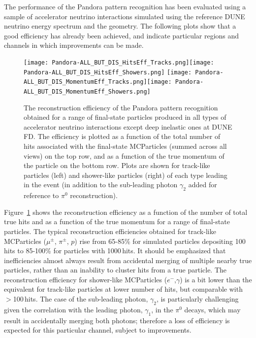 The performance of the Pandora pattern recognition has been evaluated using a sample of accelerator neutrino interactions simulated using the reference DUNE neutrino energy spectrum and the \nominalmodsize {} geometry. The following plots show that a good efficiency has already been achieved, and indicate particular regions and channels in which improvements can be made. 

\begin{figure}[!ht]
\centering
\texttt{[image: Pandora-ALL\_BUT\_DIS\_HitsEff\_Tracks.png]}\texttt{[image: Pandora-ALL\_BUT\_DIS\_HitsEff\_Showers.png]}
\texttt{[image: Pandora-ALL\_BUT\_DIS\_MomentumEff\_Tracks.png]}\texttt{[image: Pandora-ALL\_BUT\_DIS\_MomentumEff\_Showers.png]}

\caption[Reconstruction efficiency of Pandora pattern recognition for a range of final-state particles at the ]{The reconstruction efficiency of the Pandora pattern recognition obtained for a range of final-state particles produced in all types of accelerator neutrino interactions except deep inelastic ones at DUNE FD. The efficiency is plotted as a function of the total number of \twod hits associated with the final-state MCParticles (summed across all views) on the top row, and as a function of the true momentum of the particle on the bottom row. Plots are shown for track-like particles (left) and shower-like particles (right) of each type leading in the event (in addition to the sub-leading photon $\gamma_2$ added for reference to $\pi^0$ reconstruction).}
\label{pandora_particle_efficiency}
\end{figure}

Figure~\ref{pandora_particle_efficiency} shows the reconstruction efficiency as a function of the number of total true \twod hits and as a function of the true momentum for a range of final-state particles. The typical reconstruction efficiencies obtained for track-like MCParticles ($\mu^{\pm}$, $\pi^{\pm}$, $p$) rise from 65-85\% for simulated particles depositing 100\,hits to 85-100\% for particles with 1000\,hits. It should be emphasized that inefficiencies almost always result from accidental merging of multiple nearby true particles, rather than an inability to cluster hits from a true particle. The reconstruction efficiency for shower-like MCParticles ($e^{-}$,$\gamma$) is a bit lower than the equivalent for track-like particles at lower number of hits, but comparable with $>$100\,hits. The case of the sub-leading photon, $\gamma_2$, is particularly challenging given the correlation with the leading photon, $\gamma_1$, in the $\pi^0$ decays, which may result in accidentally merging both photons; therefore a loss of efficiency is expected for this particular channel, subject to improvements. 


